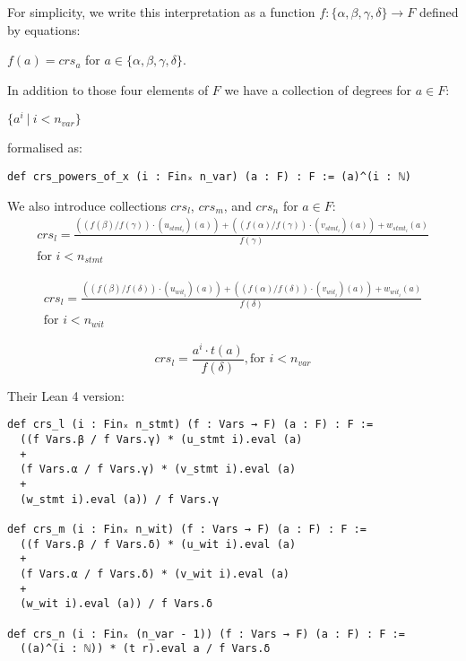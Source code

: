 \documentclass{article}
\theoremstyle{definition}
\theoremstyle{remark}
\begin{document}
For simplicity, we write this interpretation as a function $f :  \{ \alpha,\beta,\gamma, \delta \} \to F$ defined by equations:
\begin{center}
$f(a) = crs_{a}$ for $a \in \{ \alpha,\beta,\gamma, \delta \}$.
\end{center}

In addition to those four elements of $F$ we have a collection of degrees for $a \in F$:
\begin{center}
$\{ a^i \: | \: i < n_{var} \}$
\end{center}
formalised as:
\begin{lstlisting}
def crs_powers_of_x (i : Finₓ n_var) (a : F) : F := (a)^(i : ℕ)
\end{lstlisting}

We also introduce collections $crs_l$, $crs_m$, and $crs_n$ for $a \in F$:
\begin{multline}
crs_l = \frac{((f(\beta) / f(\gamma)) \cdot (u_{{stmt}_i})(a)) + ((f(\alpha) / f(\gamma)) \cdot (v_{{stmt}_i})(a)) + w_{{stmt}_i}(a)}{f(\gamma)} \\ \text{for $i < n_{stmt}$}
\end{multline}

\begin{multline}
crs_l = \frac{((f(\beta) / f(\delta)) \cdot (u_{{wit}_i})(a)) + ((f(\alpha) / f(\delta)) \cdot (v_{{wit}_i})(a)) + w_{{wit}_i}(a)}{f(\delta)} \\ \text{for $i < n_{wit}$}
\end{multline}

\begin{equation}
crs_l = \frac{a^i \cdot t(a)}{f(\delta)}, \text{for $i < n_{var}$}
\end{equation}

Their Lean 4 version:

\begin{lstlisting}
def crs_l (i : Finₓ n_stmt) (f : Vars → F) (a : F) : F :=
  ((f Vars.β / f Vars.γ) * (u_stmt i).eval (a)
  +
  (f Vars.α / f Vars.γ) * (v_stmt i).eval (a)
  +
  (w_stmt i).eval (a)) / f Vars.γ

def crs_m (i : Finₓ n_wit) (f : Vars → F) (a : F) : F :=
  ((f Vars.β / f Vars.δ) * (u_wit i).eval (a)
  +
  (f Vars.α / f Vars.δ) * (v_wit i).eval (a)
  +
  (w_wit i).eval (a)) / f Vars.δ

def crs_n (i : Finₓ (n_var - 1)) (f : Vars → F) (a : F) : F :=
  ((a)^(i : ℕ)) * (t r).eval a / f Vars.δ
\end{lstlisting}
\end{document}
